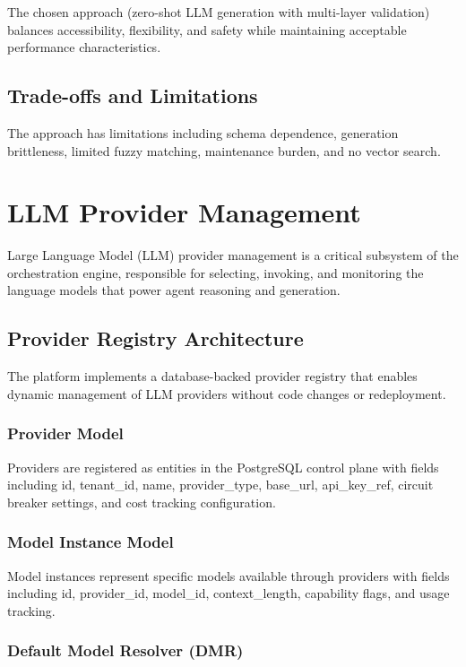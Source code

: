 \documentclass[a4paper,twoside]{sapthesis}
\begin{document}
The chosen approach (zero-shot LLM generation with multi-layer validation) balances accessibility, flexibility, and safety while maintaining acceptable performance characteristics.

\subsection{Trade-offs and Limitations}

The approach has limitations including schema dependence, generation brittleness, limited fuzzy matching, maintenance burden, and no vector search.

\section{LLM Provider Management}
\label{sec:llm-providers}

Large Language Model (LLM) provider management is a critical subsystem of the orchestration engine, responsible for selecting, invoking, and monitoring the language models that power agent reasoning and generation.

\subsection{Provider Registry Architecture}

The platform implements a database-backed provider registry that enables dynamic management of LLM providers without code changes or redeployment.

\subsubsection{Provider Model}

Providers are registered as entities in the PostgreSQL control plane with fields including id, tenant\_id, name, provider\_type, base\_url, api\_key\_ref, circuit breaker settings, and cost tracking configuration.

\subsubsection{Model Instance Model}

Model instances represent specific models available through providers with fields including id, provider\_id, model\_id, context\_length, capability flags, and usage tracking.

\subsubsection{Default Model Resolver (DMR)}
\end{document}

